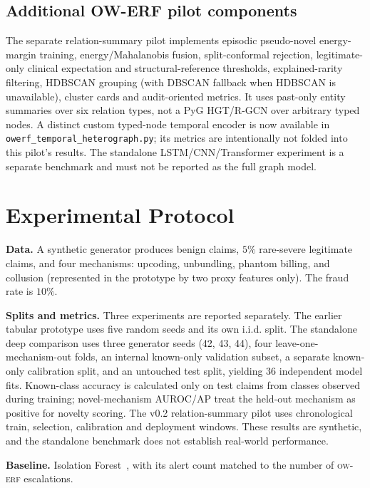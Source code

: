 \documentclass[conference]{IEEEtran}
\newcommand{\ERF}{\textsc{ow-erf}}
\begin{document}
\subsection{Additional OW-ERF pilot components}
The separate relation-summary pilot implements episodic pseudo-novel energy-margin training, energy/Mahalanobis fusion, split-conformal rejection, legitimate-only clinical expectation and structural-reference thresholds, explained-rarity filtering, HDBSCAN grouping (with DBSCAN fallback when HDBSCAN is unavailable), cluster cards and audit-oriented metrics. It uses past-only entity summaries over six relation types, not a PyG HGT/R-GCN over arbitrary typed nodes. A distinct custom typed-node temporal encoder is now available in \texttt{owerf\_temporal\_heterograph.py}; its metrics are intentionally not folded into this pilot's results. The standalone LSTM/CNN/Transformer experiment is a separate benchmark and must not be reported as the full graph model.

\section{Experimental Protocol}
\textbf{Data.} A synthetic generator produces benign claims, $5\%$ rare-severe legitimate claims, and four mechanisms: upcoding, unbundling, phantom billing, and collusion (represented in the prototype by two proxy features only). The fraud rate is $10\%$.

\textbf{Splits and metrics.} Three experiments are reported separately. The earlier tabular prototype uses five random seeds and its own i.i.d. split. The standalone deep comparison uses three generator seeds (42, 43, 44), four leave-one-mechanism-out folds, an internal known-only validation subset, a separate known-only calibration split, and an untouched test split, yielding 36 independent model fits. Known-class accuracy is calculated only on test claims from classes observed during training; novel-mechanism AUROC/AP treat the held-out mechanism as positive for novelty scoring. The v0.2 relation-summary pilot uses chronological train, selection, calibration and deployment windows. These results are synthetic, and the standalone benchmark does not establish real-world performance.

\textbf{Baseline.} Isolation Forest~\cite{liu2008iforest}, with its alert count matched to the number of \ERF{} escalations.
\end{document}
